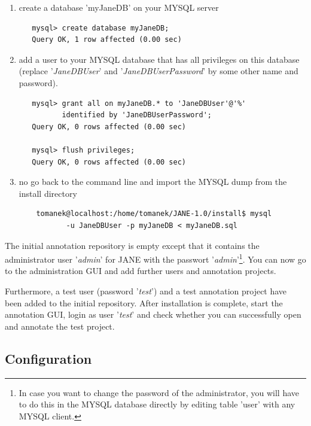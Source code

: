\documentclass[DIV12,english,11pt,halfparskip]{scrartcl}
\begin{document}
\begin{enumerate}
 \item create a database 'myJaneDB' on your MYSQL server
\begin{verbatim}
   mysql> create database myJaneDB;
   Query OK, 1 row affected (0.00 sec)
\end{verbatim}

 \item add a user to your MYSQL database that has all privileges on
   this database (replace '\emph{JaneDBUser}' and
   '\emph{JaneDBUserPassword}' by some other name and password).
\begin{verbatim}
   mysql> grant all on myJaneDB.* to 'JaneDBUser'@'%'
          identified by 'JaneDBUserPassword';
   Query OK, 0 rows affected (0.00 sec)

   mysql> flush privileges;
   Query OK, 0 rows affected (0.00 sec)
\end{verbatim}

 \item no go back to the command line and import the MYSQL dump from
   the install directory
\begin{verbatim}
    tomanek@localhost:/home/tomanek/JANE-1.0/install$ mysql 
           -u JaneDBUser -p myJaneDB < myJaneDB.sql
\end{verbatim}
\end{enumerate}


The initial annotation repository is empty except that it contains the
administrator user '\emph{admin}' for JANE with the passwort
'\emph{admin}'\footnote{In case you want to change the password of the
  administrator, you will have to do this in the MYSQL database
  directly by editing table 'user' with any MYSQL client.}. You can
now go to the administration GUI and add further users and annotation
projects.

  Furthermore, a test user (password '\emph{test}') and a test
  annotation project have been added to the initial repository. After
  installation is complete, start the annotation GUI, login as user
  '\emph{test}' and check whether you can successfully open and
  annotate the test project.



\subsection{Configuration}
\end{document}
